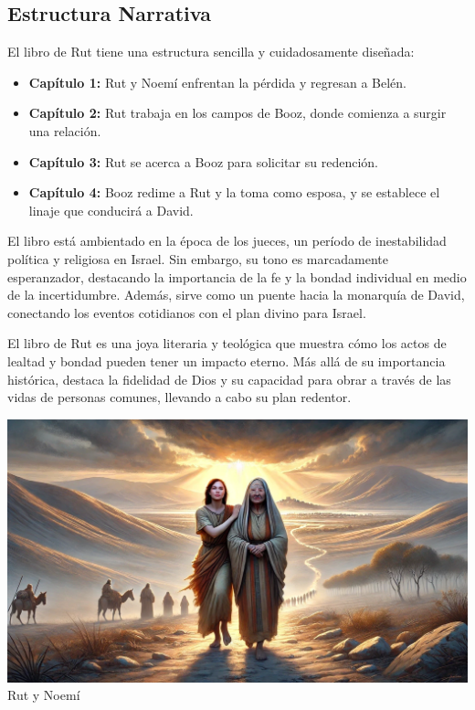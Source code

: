 \subsection*{Estructura Narrativa}

El libro de Rut tiene una estructura sencilla y cuidadosamente diseñada:
\begin{itemize}
	\item \textbf{Capítulo 1:} Rut y Noemí enfrentan la pérdida y regresan a Belén.
	\item \textbf{Capítulo 2:} Rut trabaja en los campos de Booz, donde comienza a surgir una relación.
	\item \textbf{Capítulo 3:} Rut se acerca a Booz para solicitar su redención.
	\item \textbf{Capítulo 4:} Booz redime a Rut y la toma como esposa, y se establece el linaje que conducirá a David.
\end{itemize}



El libro está ambientado en la época de los jueces, un período de inestabilidad política y religiosa en Israel. Sin embargo, su tono es marcadamente esperanzador, destacando la importancia de la fe y la bondad individual en medio de la incertidumbre. Además, sirve como un puente hacia la monarquía de David, conectando los eventos cotidianos con el plan divino para Israel.


El libro de Rut es una joya literaria y teológica que muestra cómo los actos de lealtad y bondad pueden tener un impacto eterno. Más allá de su importancia histórica, destaca la fidelidad de Dios y su capacidad para obrar a través de las vidas de personas comunes, llevando a cabo su plan redentor.


	\begin{center}
		\includegraphics[width=0.7\linewidth]{graficas/Rut}\\
	Rut y Noemí  \\
	\end{center}



